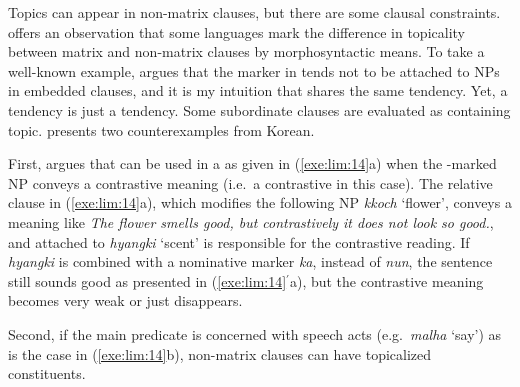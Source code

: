 Topics can appear in non-matrix clauses, but there are some clausal
constraints.  \citet[p.\ 126]{lambrecht:96} offers an observation that
some languages mark the difference in topicality between matrix and
non-matrix clauses by morphosyntactic means.  To take a well-known
example, \citet{kuno:73} argues that the  marker \wa in
 tends not to be attached to NPs in embedded clauses,
and it is my intuition that  shares the same tendency.
Yet, a tendency is just a tendency.  Some subordinate clauses are
evaluated as containing topic.   presents two
counterexamples from Korean.





\noindent First, \citeauthor{lim:12} argues that \nun can be used in a
 as given in (\ref{exe:lim:14}a) when the
\nun-marked NP conveys a contrastive meaning (i.e.\ a contrastive
 in this case).  The relative clause in (\ref{exe:lim:14}a),
which modifies the following NP \textit{kkoch} `flower', conveys a
meaning like \textit{The flower smells good, but contrastively it does
  not look so good.}, and \nun attached to \textit{hyangki} `scent' is
responsible for the contrastive reading. If \textit{hyangki} is
combined with a nominative marker \textit{ka}, instead of
\textit{nun}, the sentence still sounds good as presented in
(\ref{exe:lim:14}$^\ensuremath{\prime}$a), but the contrastive meaning
becomes very weak or just disappears.




\noindent Second, if the main predicate is concerned with speech acts
(e.g.\ \textit{malha} `say') as is the case in (\ref{exe:lim:14}b),
non-matrix clauses can have topicalized constituents.


